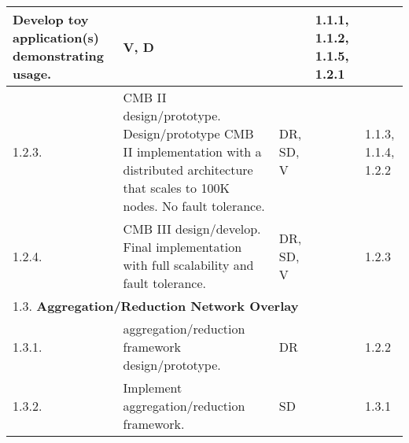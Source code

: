 \begin{longtable}{|p{1cm}|p{10.2cm}|p{1cm}|p{1cm}|p{1.8cm}|}
          Develop toy application(s) demonstrating usage.
	& V, D
	&  
	& 1.1.1, 1.1.2, 1.1.5, 1.2.1 \\
  \hline
  1.2.3.  & CMB II design/prototype.  Design/prototype CMB II 
          implementation with a distributed architecture that scales
          to 100K nodes.   No fault tolerance.
	& DR, SD, V
	&  
	& 1.1.3, 1.1.4, 1.2.2 \\
  \hline
  1.2.4.  & CMB III design/develop.  Final implementation with full
	  scalability and fault tolerance.
	& DR, SD, V
	&  
	& 1.2.3 \\
  \hline
  \multicolumn{5}{|l|}{1.3. \textbf{Aggregation/Reduction Network Overlay}} \\
  \hline
  1.3.1.& aggregation/reduction framework design/prototype.
	& DR
	&
	& 1.2.2\\
  \hline
  1.3.2.& Implement aggregation/reduction framework.
	& SD
	&
	& 1.3.1\\
  \hline
\end{longtable}
\fi
